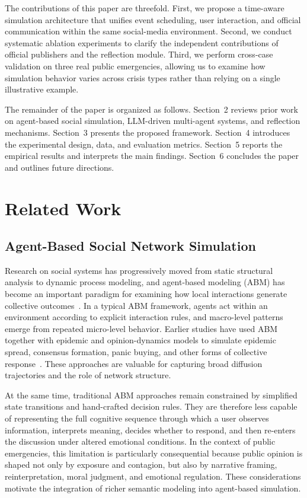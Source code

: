 \documentclass[11pt]{article}
\begin{document}
The contributions of this paper are threefold. First, we propose a time-aware simulation architecture that unifies event scheduling, user interaction, and official communication within the same social-media environment. Second, we conduct systematic ablation experiments to clarify the independent contributions of official publishers and the reflection module. Third, we perform cross-case validation on three real public emergencies, allowing us to examine how simulation behavior varies across crisis types rather than relying on a single illustrative example.

The remainder of the paper is organized as follows. Section~2 reviews prior work on agent-based social simulation, LLM-driven multi-agent systems, and reflection mechanisms. Section~3 presents the proposed framework. Section~4 introduces the experimental design, data, and evaluation metrics. Section~5 reports the empirical results and interprets the main findings. Section~6 concludes the paper and outlines future directions.

\section{Related Work}

\subsection{Agent-Based Social Network Simulation}
Research on social systems has progressively moved from static structural analysis to dynamic process modeling, and agent-based modeling (ABM) has become an important paradigm for examining how local interactions generate collective outcomes~\citep{li2026abm, gilbert2008agent, wang2025abm}. In a typical ABM framework, agents act within an environment according to explicit interaction rules, and macro-level patterns emerge from repeated micro-level behavior. Earlier studies have used ABM together with epidemic and opinion-dynamics models to simulate epidemic spread, consensus formation, panic buying, and other forms of collective response~\citep{wu2024epidemic, alatas2017opinion, fan2024panic}. These approaches are valuable for capturing broad diffusion trajectories and the role of network structure.

At the same time, traditional ABM approaches remain constrained by simplified state transitions and hand-crafted decision rules. They are therefore less capable of representing the full cognitive sequence through which a user observes information, interprets meaning, decides whether to respond, and then re-enters the discussion under altered emotional conditions. In the context of public emergencies, this limitation is particularly consequential because public opinion is shaped not only by exposure and contagion, but also by narrative framing, reinterpretation, moral judgment, and emotional regulation. These considerations motivate the integration of richer semantic modeling into agent-based simulation.
\end{document}
